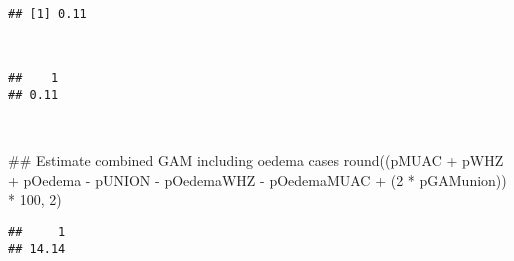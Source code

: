 \documentclass[12pt,a4paper]{article}
\newenvironment{Shaded}{}{}
\newcommand{\CommentTok}[1]{\textcolor[rgb]{0.00,0.50,0.00}{#1}}
\newcommand{\DecValTok}[1]{#1}
\newcommand{\KeywordTok}[1]{\textcolor[rgb]{0.00,0.00,1.00}{#1}}
\newcommand{\NormalTok}[1]{#1}
\newcommand{\OperatorTok}[1]{#1}
\newcommand{\StringTok}[1]{\textcolor[rgb]{0.00,0.50,0.50}{#1}}
\begin{document}
\begin{verbatim}
## [1] 0.11
\end{verbatim}

~

\begin{Shaded}
\end{Shaded}

\begin{verbatim}
##    1 
## 0.11
\end{verbatim}

~

\begin{Shaded}
\begin{Highlighting}[]
\CommentTok{## Estimate combined GAM including oedema cases}
\KeywordTok{round}\NormalTok{((pMUAC }\OperatorTok{+}\StringTok{ }\NormalTok{pWHZ }\OperatorTok{+}\StringTok{ }\NormalTok{pOedema }\OperatorTok{-}\StringTok{ }\NormalTok{pUNION }\OperatorTok{-}\StringTok{ }\NormalTok{pOedemaWHZ }\OperatorTok{-}\StringTok{ }
\StringTok{         }\NormalTok{pOedemaMUAC }\OperatorTok{+}\StringTok{ }\NormalTok{(}\DecValTok{2} \OperatorTok{*}\StringTok{ }\NormalTok{pGAMunion)) }\OperatorTok{*}\StringTok{ }\DecValTok{100}\NormalTok{, }\DecValTok{2}\NormalTok{)}
\end{Highlighting}
\end{Shaded}

\begin{verbatim}
##     1 
## 14.14
\end{verbatim}


\end{document}
